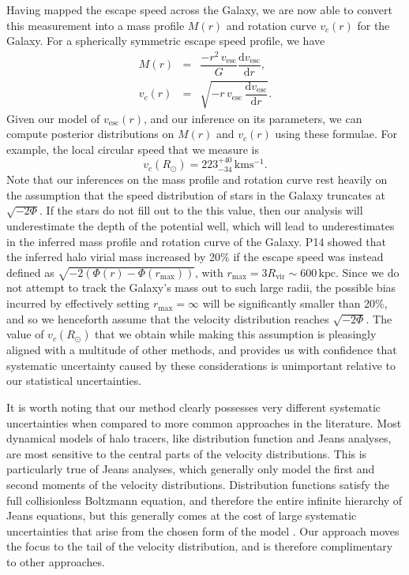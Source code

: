 \documentclass[useAMS,twocolumn,usenatbib]{mn2e}
\def\kpc{{\,\mathrm{kpc}}}
\def\kms{{\,\mathrm{kms^{-1}}}}
\def\vesc{{v_\mathrm{esc}}}
\begin{document}
Having mapped the escape speed across the Galaxy, we are now able to convert this measurement into a mass profile $M(r)$ and rotation curve $v_c(r)$ for the Galaxy. 
For a spherically symmetric escape speed profile, we have
%
\begin{eqnarray}
M(r) &=& \dfrac{-r^2\,\vesc}{G}\dfrac{\mathrm{d}\vesc}{\mathrm{d}r}, \label{eq:mass}\\
v_c(r) &=& \sqrt{-r\,\vesc\,\dfrac{\mathrm{d}\vesc}{\mathrm{d}r}}. \label{eq:circspeed}
\end{eqnarray}
%
Given our model of $\vesc(r)$, and our inference on its parameters, we can compute posterior distributions on $M(r)$ and $v_c(r)$ using these formulae.
For example, the local circular speed that we measure is
%
\begin{equation}
v_c(R_\odot) = 223^{+40}_{-34}\kms.
\end{equation}
%
Note that our inferences on the mass profile and rotation curve rest heavily on the assumption that the speed distribution of stars in the Galaxy truncates at $\sqrt{-2\Phi}$.
If the stars do not fill out to the this value, then our analysis will underestimate the depth of the potential well, which will lead to underestimates in the inferred mass profile and rotation curve of the Galaxy.
P14 showed that the inferred halo virial mass increased by 20\% if the escape speed was instead defined as $\sqrt{-2\left(\Phi(r) - \Phi(r_\mathrm{max})\right)}$, with $r_\mathrm{max} = 3R_\mathrm{vir} \sim 600\kpc$.
Since we do not attempt to track the Galaxy's mass out to such large radii, the possible bias incurred by effectively setting $r_\mathrm{max} = \infty$ will be significantly smaller than 20\%, and so we henceforth assume that the velocity distribution reaches $\sqrt{-2\Phi}$.
The value of $v_c(R_\odot)$ that we obtain while making this assumption is pleasingly aligned with a multitude of other methods, and provides us with confidence that systematic uncertainty caused by these considerations is unimportant relative to our statistical uncertainties.

It is worth noting that our method clearly possesses very different systematic uncertainties when compared to more common approaches in the literature.
Most dynamical models of halo tracers, like distribution function and Jeans analyses, are most sensitive to the central parts of the velocity distributions.
This is particularly true of Jeans analyses, which generally only model the first and second moments of the velocity distributions. 
Distribution functions satisfy the full collisionless Boltzmann equation, and therefore the entire infinite hierarchy of Jeans equations, but this generally comes at the cost of large systematic uncertainties that arise from the chosen form of the model \citep{Wa15}.  
Our approach moves the focus to the tail of the velocity distribution, and is therefore complimentary to other approaches.
\end{document}
